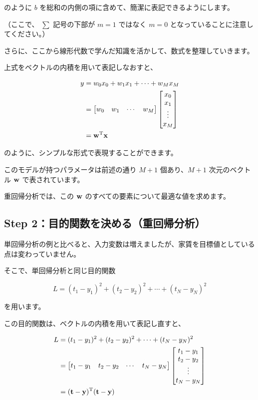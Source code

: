 のように $b$ を総和の内側の項に含めて、簡潔に表記できるようにします。

（ここで、 $\sum$ 記号の下部が $m=1$ ではなく $m=0$ となっていることに注意してください。）


さらに、ここから線形代数で学んだ知識を活かして、数式を整理していきます。

上式をベクトルの内積を用いて表記しなおすと、


\[
\begin{aligned}
y
&= w_{0}x_{0} + w_{1}x_{1} + \cdots + w_{M}x_{M} \\
&=
\begin{bmatrix}
w_{0} & w_{1} & \cdots  & w_{M}
\end{bmatrix}
\begin{bmatrix}
x_{0} \\
x_{1} \\
\vdots \\
x_{M}
\end{bmatrix} \\
&= {\bf w}^{\rm T}{\bf x}
\end{aligned}
\]


のように、シンプルな形式で表現することができます。

このモデルが持つパラメータは前述の通り $M + 1$ 個あり、$M + 1$ 次元のベクトル ${\bf w}$ で表されています。

重回帰分析では、この ${\bf w}$ のすべての要素について最適な値を求めます。


\subsection{Step 2：目的関数を決める（重回帰分析）}


単回帰分析の例と比べると、入力変数は増えましたが、家賃を目標値としている点は変わっていません。

そこで、単回帰分析と同じ目的関数


\[
L = (t_1 - y_1)^2 + (t_2 - y_2)^2 + \cdots + (t_N - y_N)^2
\]


を用います。

この目的関数は、ベクトルの内積を用いて表記し直すと、


\[
\begin{aligned}
L
&= (t_1 - y_1)^2 + (t_2 - y_2)^2 + \cdots + (t_N - y_N)^2 \\
&= \begin{bmatrix}
t_1 - y_1 & t_2 - y_2 & \cdots & t_N - y_N
\end{bmatrix}
\begin{bmatrix}
t_1 - y_1 \\
t_2 - y_2 \\
\vdots \\
t_N - y_N
\end{bmatrix} \\
&= ({\bf t} - {\bf y})^{\rm T}({\bf t} - {\bf y})
\end{aligned}
\]


